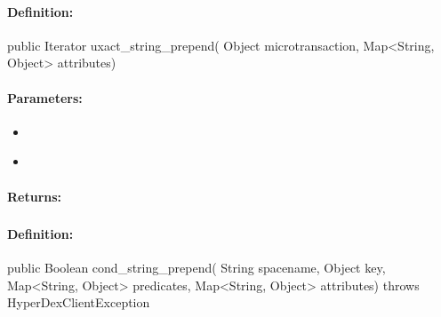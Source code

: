 \paragraph{Definition:}
\begin{javacode}
public Iterator uxact_string_prepend(
        Object microtransaction,
        Map<String, Object> attributes)
\end{javacode}

\paragraph{Parameters:}
\begin{itemize}[noitemsep]
\item {}\\

\item {}\\

\end{itemize}

\paragraph{Returns:}


\pagebreak
\subsubsection{}
\label{api:java:cond_string_prepend}


\paragraph{Definition:}
\begin{javacode}
public Boolean cond_string_prepend(
        String spacename,
        Object key,
        Map<String, Object> predicates,
        Map<String, Object> attributes) throws HyperDexClientException
\end{javacode}

